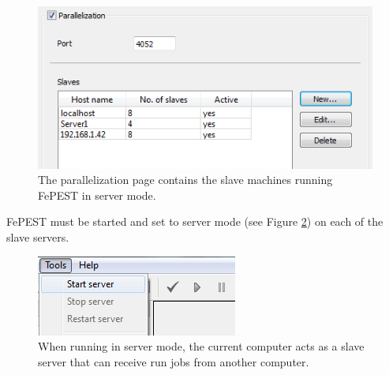 \begin{figure}
	\center
	\includegraphics[width=\columnwidth]{figureFundamentalSetup/ParallelizationMenu.png}
\caption{The parallelization page contains the slave machines running FePEST in server mode.}
\label{fig:fepest:ParallelizationMenu}
\end{figure}

FePEST must be started and set to server mode (see Figure \ref{fig:fepest:StartServer}) on each of the slave servers.

\begin{figure}
	\center
	\includegraphics[width=0.7\columnwidth]{figureFundamentalSetup/StartServer.png}
\caption{When running in server mode, the current computer acts as a slave server that can receive run jobs from another computer.}
\label{fig:fepest:StartServer}
\end{figure}
